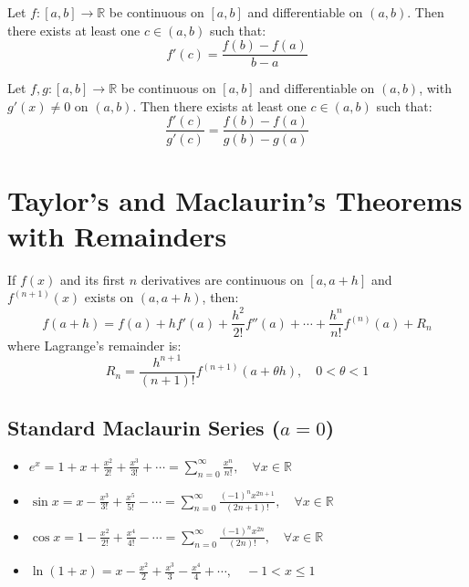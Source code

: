 \begin{theorem}
Let $f:[a,b] \to \mathbb{R}$ be continuous on $[a,b]$ and differentiable on $(a,b)$. Then there exists at least one $c \in (a,b)$ such that:
\begin{equation}
f'(c) = \frac{f(b) - f(a)}{b - a}
\end{equation}
\end{theorem}

\begin{theorem}
Let $f, g:[a,b] \to \mathbb{R}$ be continuous on $[a,b]$ and differentiable on $(a,b)$, with $g'(x) \ne 0$ on $(a,b)$. Then there exists at least one $c \in (a,b)$ such that:
\begin{equation}
\frac{f'(c)}{g'(c)} = \frac{f(b) - f(a)}{g(b) - g(a)}
\end{equation}
\end{theorem}

\section{Taylor's and Maclaurin's Theorems with Remainders}

\begin{theorem}
If $f(x)$ and its first $n$ derivatives are continuous on $[a, a+h]$ and $f^{(n+1)}(x)$ exists on $(a, a+h)$, then:
\begin{equation}
f(a+h) = f(a) + h f'(a) + \frac{h^2}{2!} f''(a) + \cdots + \frac{h^n}{n!} f^{(n)}(a) + R_n
\end{equation}
where Lagrange's remainder is:
\begin{equation}
R_n = \frac{h^{n+1}}{(n+1)!} f^{(n+1)}(a + \theta h), \quad 0 < \theta < 1
\end{equation}
\end{theorem}

\subsection{Standard Maclaurin Series ($a = 0$)}
\begin{itemize}[leftmargin=1.5em]
    \item $e^x = 1 + x + \frac{x^2}{2!} + \frac{x^3}{3!} + \cdots = \sum_{n=0}^\infty \frac{x^n}{n!}, \quad \forall x \in \mathbb{R}$
    \item $\sin x = x - \frac{x^3}{3!} + \frac{x^5}{5!} - \cdots = \sum_{n=0}^\infty \frac{(-1)^n x^{2n+1}}{(2n+1)!}, \quad \forall x \in \mathbb{R}$
    \item $\cos x = 1 - \frac{x^2}{2!} + \frac{x^4}{4!} - \cdots = \sum_{n=0}^\infty \frac{(-1)^n x^{2n}}{(2n)!}, \quad \forall x \in \mathbb{R}$
    \item $\ln(1+x) = x - \frac{x^2}{2} + \frac{x^3}{3} - \frac{x^4}{4} + \cdots, \quad -1 < x \le 1$
\end{itemize}

